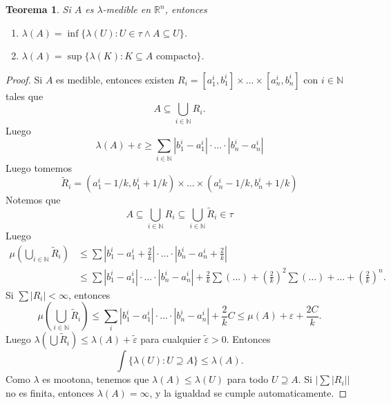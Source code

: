 \documentclass{article}
\newtheorem{theorem}{Teorema}[subsection]
\theoremstyle{definition}
\theoremstyle{remark}
\numberwithin{equation}{section}
\newcommand{\N}{\mathbb{N}}
\newcommand{\R}{\mathbb{R}}
\newcommand{\e}{\varepsilon}
\renewcommand{\t}{\tau}
\newcommand{\lam}{\lambda}
\newcommand{\oo}{\infty}
\renewcommand{\tilde}{\widetilde}
\newcommand{\abs}[1]{\left| #1 \right|}
\newcommand{\br}[1]{\left( #1 \right)}
\begin{document}
\begin{theorem}
  Si $A$ es $\lam$-medible en $\R^n$, entonces
  \begin{enumerate}[(1)]
    \item $\lam(A) = \inf\{\lam(U) \colon U \in \t \land A \subseteq U\}$.
    \item $\lam(A) = \sup\{\lam(K) \colon K \subseteq A \text{ compacto}\}$.
  \end{enumerate}
\end{theorem}
\begin{proof}
  Si $A$ es medible, entonces existen $R_i = [a_1^i, b_1^i] \times \dots \times [a_n^i, b_n^i]$ con $i \in \N$ tales que
  \[A \subseteq \bigcup_{i \in \N} R_i.\]
  Luego
  \[\lam(A) + \e \geq \sum_{i\in\N} \abs{b_1^i - a_1^i} \cdot \dots \cdot \abs{b_n^i - a_n^i}\]
  Luego tomemos
  \[\tilde R_i = (a_1^i - 1/k, b_1^i + 1/k) \times \dots \times (a_n^i - 1/k, b_n^i + 1/k)\]
  Notemos que
  \[A \subseteq \bigcup_{i \in \N} R_i \subseteq \bigcup_{i \in \N} \tilde R_i \in \t\]
  Luego
  \begin{align*}
    \mu\br{\bigcup_{i \in \N} \tilde R_i}
    &\leq \sum \abs{b_1^i - a_1^i + \frac{2}{k}} \cdot \dots \cdot \abs{b_n^i - a_n^i + \frac{2}{k}} \\
    &\leq \sum \abs{b_1^i - a_1^i} \cdot \dots \cdot \abs{b_n^i - a_n^i}
    + \frac{2}{k} \sum (\dots)
    + \br{\frac{2}{k}}^2 \sum (\dots) + \dots + \br{\frac{2}{k}}^n.
  \end{align*}
  Si $\sum \abs{R_i} < \oo$, entonces
  \[\mu\br{\bigcup_{i \in \N} \tilde R_i} \leq \sum_i \abs{b_1^i - a_1^i} \cdot \dots \cdot \abs{b_n^i - a_n^i} + \frac{2}{k} C
  \leq \mu(A) + \e + \frac{2C}{k}.\]
  Luego $\lam\br{\bigcup \tilde R_i} \leq \lam(A) + \tilde \e$ para cualquier $\tilde\e>0$. Entonces
  \[\int\{\lam(U) \colon U \supseteq A\} \leq \lam(A).\]
  Como $\lam$ es mootona, tenemos que $\lam(A) \leq \lam(U)$ para todo $U \supseteq A$.
  Si $\abs{\sum \abs{R_i}}$ no es finita, entonces $\lam(A) = \oo$, y la igualdad se cumple automaticamente.


\end{proof}
\end{document}
